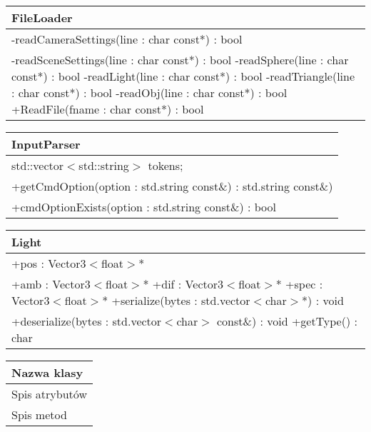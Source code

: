 \begin{center}
    \begin{tabular}{|l|}
    \hline
    FileLoader \\ \hline
    -readCameraSettings(line : char const*) : bool \\
    -readSceneSettings(line : char const*) : bool
    -readSphere(line : char const*) : bool
    -readLight(line : char const*) : bool
    -readTriangle(line : char const*) : bool
    -readObj(line : char const*) : bool
	+ReadFile(fname : char const*) : bool \\ \hline
    \end{tabular}
\end{center}


\begin{center}
    \begin{tabular}{|l|}
    \hline
    InputParser \\ \hline
    std::vector$<$std::string$>$ tokens; \\ \hline
    +getCmdOption(option : std.string const\&) : std.string const\&) \\
    +cmdOptionExists(option : std.string const\&) : bool \\ \hline
    \end{tabular}
\end{center}


\begin{center}
    \begin{tabular}{|l|}
    \hline
    Light \\ \hline
    +pos : Vector3$<$float$>$* \\ 
    +amb : Vector3$<$float$>$*
    +dif : Vector3$<$float$>$*
    +spec : Vector3$<$float$>$*   
    \hline
	+serialize(bytes : std.vector$<$char$>$*) : void \\ 
	+deserialize(bytes : std.vector$<$char$>$ const\&) : void
	+getType() : char
	\hline
    \end{tabular}
\end{center}


\begin{center}
    \begin{tabular}{|l|}
    \hline
    Nazwa klasy \\ \hline
    Spis atrybutów \\ \hline
	Spis metod \\ \hline
    \end{tabular}
\end{center}


